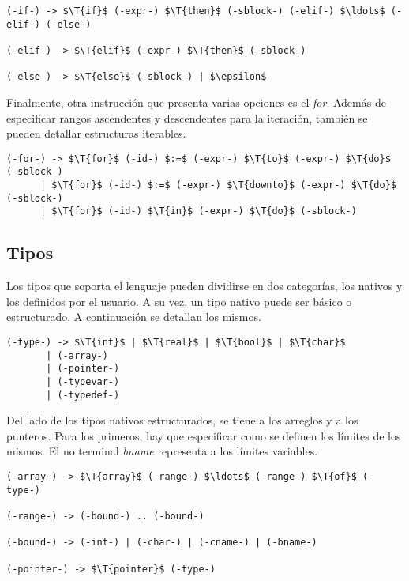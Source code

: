 \documentclass{article}
\begin{document}
\begin{lstlisting}[style = syntax]
(-if-) -> $\T{if}$ (-expr-) $\T{then}$ (-sblock-) (-elif-) $\ldots$ (-elif-) (-else-)

(-elif-) -> $\T{elif}$ (-expr-) $\T{then}$ (-sblock-)

(-else-) -> $\T{else}$ (-sblock-) | $\epsilon$ 
\end{lstlisting}

Finalmente, otra instrucción que presenta varias opciones es el \textit{for}.
Además de especificar rangos ascendentes y descendentes para la iteración, también se pueden detallar estructuras iterables.

\begin{lstlisting}[style = syntax]
(-for-) -> $\T{for}$ (-id-) $:=$ (-expr-) $\T{to}$ (-expr-) $\T{do}$ (-sblock-)
      | $\T{for}$ (-id-) $:=$ (-expr-) $\T{downto}$ (-expr-) $\T{do}$ (-sblock-)
      | $\T{for}$ (-id-) $\T{in}$ (-expr-) $\T{do}$ (-sblock-)
\end{lstlisting}

\subsection{Tipos}

Los tipos que soporta el lenguaje pueden dividirse en dos categorías, los nativos y los definidos por el usuario.
A su vez, un tipo nativo puede ser básico o estructurado.
A continuación se detallan los mismos.

\begin{lstlisting}[style = syntax]
(-type-) -> $\T{int}$ | $\T{real}$ | $\T{bool}$ | $\T{char}$
       | (-array-)
       | (-pointer-)
       | (-typevar-)
       | (-typedef-)
\end{lstlisting}

Del lado de los tipos nativos estructurados, se tiene a los arreglos y a los punteros.
Para los primeros, hay que especificar como se definen los límites de los mismos.
El no terminal \textit{bname} representa a los límites variables.

\begin{lstlisting}[style = syntax]
(-array-) -> $\T{array}$ (-range-) $\ldots$ (-range-) $\T{of}$ (-type-)

(-range-) -> (-bound-) .. (-bound-)

(-bound-) -> (-int-) | (-char-) | (-cname-) | (-bname-)

(-pointer-) -> $\T{pointer}$ (-type-)
\end{lstlisting}
\end{document}
